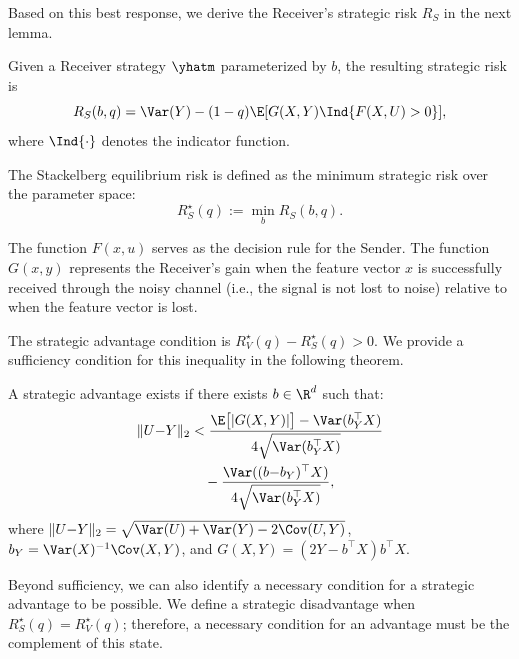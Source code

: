 Based on this best response, we derive the Receiver's strategic risk $R_S$ in the next lemma.

\begin{lemma} \label{lem:rs_regression}
  Given a Receiver strategy $\yhatm$ parameterized by $b$, the resulting strategic risk is
  \begin{equation}
    R_S(b, q) = \Var(Y) - (1-q)\E[G(X,Y)\Ind{F(X,U) > 0}],
  \end{equation}
  where $\Ind{\cdot}$ denotes the indicator function.
\end{lemma}

\begin{remark}
The Stackelberg equilibrium risk is defined as the minimum strategic risk over the parameter space:
\begin{equation*}
  R_S^\star(q) := \min_b R_S(b, q).
\end{equation*}
\end{remark}

\begin{remark}
The function $F(x,u)$ serves as the decision rule for the Sender. The function $G(x,y)$ represents the Receiver's gain when the feature vector $x$ is successfully received through the noisy channel (i.e., the signal is not lost to noise) relative to when the feature vector is lost.
\end{remark}

The strategic advantage condition is $R_V^\star(q) - R_S^\star(q) > 0$. We provide a sufficiency condition for this inequality in the following theorem.

\begin{theorem} \label{thm:sufficiency_reg}
  A strategic advantage exists if there exists $b \in \R^d$ such that:
\begin{align}
    \|U{-}Y\|_2 
    &< 
    \frac{\E\big[| G(X,Y)|\big] 
    - \Var(b_Y^\top X)}{4\sqrt{\Var(b_Y^\top X)}} \nonumber \\
    &\quad - \frac{\Var((b{-}b_Y)^\top X)}{4\sqrt{\Var(b_Y^\top X)}}, \label{eq:sufficiency_reg}
\end{align}
  where $\|U{-}Y\|_2 = \sqrt{\Var(U) + \Var(Y) - 2 \Cov(U,Y)}$, $b_Y = \Var(X)^{-1}\Cov(X,Y)$, and $G(X,Y) = (2Y - b^\top X) b^\top X$.
\end{theorem}

Beyond sufficiency, we can also identify a necessary condition for a strategic advantage to be possible. We define a strategic disadvantage when $R_S^\star(q) = R_V^\star(q)$; therefore, a necessary condition for an advantage must be the complement of this state.


